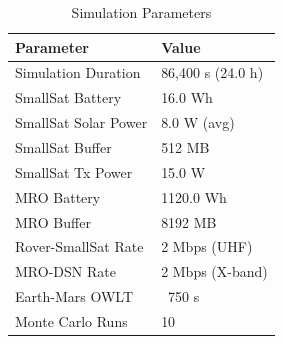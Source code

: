 \begin{table}[t]
\centering
\caption{Simulation Parameters}
\label{tab:params}
\begin{tabular}{ll}
\hline
\textbf{Parameter} & \textbf{Value} \\
\hline
Simulation Duration & 86,400 s (24.0 h) \\
SmallSat Battery & 16.0 Wh \\
SmallSat Solar Power & 8.0 W (avg) \\
SmallSat Buffer & 512 MB \\
SmallSat Tx Power & 15.0 W \\
MRO Battery & 1120.0 Wh \\
MRO Buffer & 8192 MB \\
Rover-SmallSat Rate & 2 Mbps (UHF) \\
MRO-DSN Rate & 2 Mbps (X-band) \\
Earth-Mars OWLT & ~750 s \\
Monte Carlo Runs & 10 \\
\hline
\end{tabular}
\end{table}
